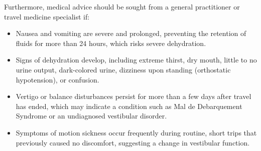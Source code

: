 Furthermore, medical advice should be sought from a general practitioner or travel medicine specialist if:
\begin{itemize}
    \item Nausea and vomiting are severe and prolonged, preventing the retention of fluids for more than 24 hours, which risks severe dehydration.
    \item Signs of dehydration develop, including extreme thirst, dry mouth, little to no urine output, dark-colored urine, dizziness upon standing (orthostatic hypotension), or confusion.
    \item Vertigo or balance disturbances persist for more than a few days after travel has ended, which may indicate a condition such as Mal de Debarquement Syndrome or an undiagnosed vestibular disorder.
    \item Symptoms of motion sickness occur frequently during routine, short trips that previously caused no discomfort, suggesting a change in vestibular function.
\end{itemize}

